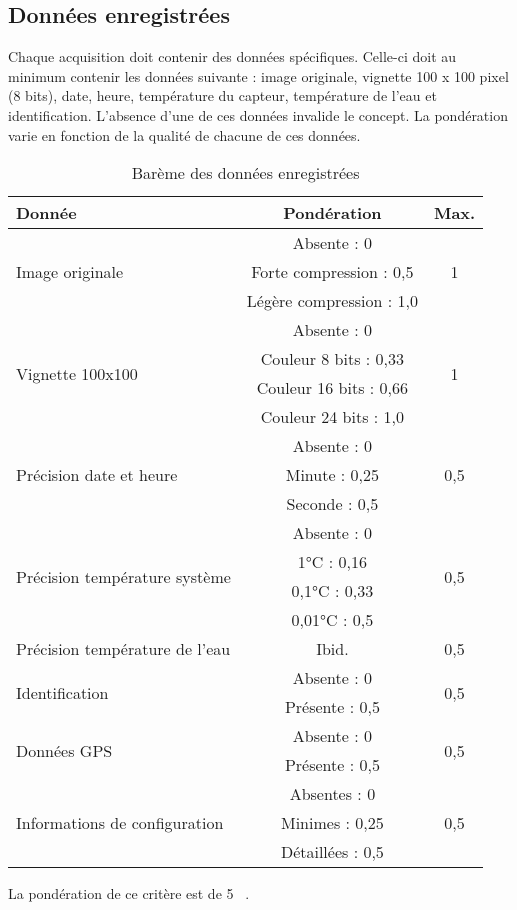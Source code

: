 

\subsection{Données enregistrées}
\label{s:cdc_pdd_donnees_enre}

Chaque acquisition doit contenir des données spécifiques.
Celle-ci doit au minimum contenir les données suivante : image originale, vignette 100 x 100 pixel (8 bits), date, heure, température du capteur, température de l’eau et identification.
L’absence d’une de ces données invalide le concept.
La pondération varie en fonction de la qualité de chacune de ces données.


\begin{table}[H]
	\caption{Barème des données enregistrées}
	\label{tab:cdc_pdd_donnees_enre}
	\centering
	\begin{tabular}{|l|c|c|}
		\hline
		Donnée & Pondération & Max. \\\hline
		\multirow{3}{*}{Image originale} & Absente : 0 & \multirow{3}{*}{1} \\
		& Forte compression : 0,5 & \\
		& Légère compression : 1,0 & \\\hline
		\multirow{4}{*}{Vignette 100x100} & Absente : 0 & \multirow{4}{*}{1} \\
		& Couleur 8 bits : 0,33 & \\
		& Couleur 16 bits : 0,66 & \\
		& Couleur 24 bits : 1,0 & \\\hline
		\multirow{3}{*}{Précision date et heure} & Absente : 0 & \multirow{3}{*}{0,5} \\
		& Minute : 0,25 & \\
		& Seconde : 0,5 & \\\hline
		\multirow{4}{*}{Précision température système} & Absente : 0 & \multirow{4}{*}{0,5} \\
		& 1°C : 0,16 & \\
		& 0,1°C : 0,33 & \\
		& 0,01°C : 0,5 & \\\hline
		Précision température de l’eau & Ibid. & 0,5 \\\hline
		\multirow{2}{*}{Identification} & Absente : 0 & \multirow{2}{*}{0,5} \\
		& Présente : 0,5 & \\\hline
		\multirow{2}{*}{Données GPS} & Absente : 0 & \multirow{2}{*}{0,5} \\
		& Présente : 0,5 & \\\hline
		\multirow{3}{*}{Informations de configuration} & Absentes : 0 & \multirow{3}{*}{0,5} \\
		& Minimes : 0,25 & \\
		& Détaillées : 0,5 & \\\hline
	\end{tabular}
\end{table}

La pondération de ce critère est de 5~ .